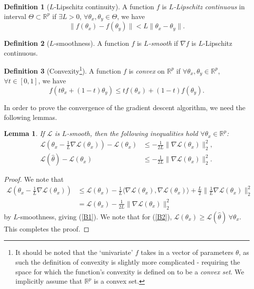 \documentclass[a4paper,11pt,titlepage]{article}
\theoremstyle{definition}
\newtheorem{definition}{Definition}[section]
\theoremstyle{plain}
\newtheorem{lemma}[theorem]{Lemma}
\theoremstyle{remark}
\begin{document}
\begin{definition}[$L$-Lipschitz continuity]
    A function $f$ is $L$\textit{-Lipschitz continuous} in interval $\Theta \subset \mathbb{R}^p$ if $\exists L > 0$, $\forall \theta_x, \theta_y \in \Theta$, we have
    $$
    \|f(\theta_x) - f(\theta_y)\| < L \| \theta_x - \theta_y\|.
    $$
\end{definition}

\begin{definition}[$L$-smoothness]
    A function $f$ is $L$\textit{-smooth} if $\nabla f$ is $L$-Lipschitz continuous.
\end{definition}

\begin{definition}[Convexity\footnote{It should be noted that the `univariate' $f$ takes in a vector of parameters $\theta$, as such the definition of convexity is slightly more complicated - requiring the space for which the function's convexity is defined on to be a \textit{convex set}. We implicitly assume that $\mathbb{R}^p$ is a convex set.}]
    A function $f$ is \textit{convex} on $\mathbb{R}^p$ if $\forall \theta_x, \theta_y \in \mathbb{R}^p$, $\forall t \in [0, 1]$, we have
    $$
    f(t\theta_x + (1 - t)\theta_y) \leq tf(\theta_x) + (1-t)f(\theta_y).
    $$
\end{definition}

In order to prove the convergence of the gradient descent algorithm, we need the following lemmas.

\begin{lemma}
    If $\mathcal{L}$ is $L$-smooth, then the following inequalities hold $\forall  \theta_x \in \mathbb{R}^p$: 
    \begin{align}
        \mathcal{L}(\theta_x - \frac{1}{L}\nabla \mathcal{L}(\theta_x)) - \mathcal{L}(\theta_x) &\leq -\frac{1}{2L} \| \nabla \mathcal{L}(\theta_x)\|_2^2, \label{B1} \\
        \mathcal{L}(\hat{\theta}) - \mathcal{L}(\theta_x) &\leq -\frac{1}{2L}\|\nabla \mathcal{L}(\theta_x)\|_2^2. \label{B2}
    \end{align}
\end{lemma}
\begin{proof}
    We note that
    \begin{align*}
        \mathcal{L}(\theta_x - \frac{1}{L}\nabla \mathcal{L}(\theta_x)) &\leq \mathcal{L}(\theta_x) - \frac{1}{L} \langle\nabla \mathcal{L}(\theta_x), \nabla \mathcal{L}(\theta_x)\rangle + \frac{L}{2} \|\frac{1}{L}\nabla \mathcal{L}(\theta_x) \|_2^2 \\
        &= \mathcal{L}(\theta_x) - \frac{1}{2L}\| \nabla \mathcal{L}(\theta_x)\|_2^2
    \end{align*}
    by $L$-smoothness, giving (\ref{B1}). We note that for (\ref{B2}), $\mathcal{L}(\theta_x) \geq \mathcal{L}(\hat{\theta}) \ \forall \theta_x$. This completes the proof.
\end{proof}
\end{document}
